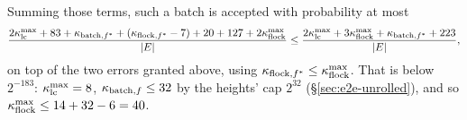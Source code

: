 Summing those terms, such a batch is accepted with probability at most
\[
\frac{2\kappa_{\mathrm{lc}}^{\max}+83+\kappa_{\mathrm{batch},f^\ast}+(\kappa_{\mathrm{flock},f^\ast}-7)+20+127+2\kappa_{\mathrm{flock}}^{\max}}{|E|}\le\frac{2\kappa_{\mathrm{lc}}^{\max}+3\kappa_{\mathrm{flock}}^{\max}+\kappa_{\mathrm{batch},f^\ast}+223}{|E|},
\]
on top of the two errors granted above, using $\kappa_{\mathrm{flock},f^\ast}\le\kappa_{\mathrm{flock}}^{\max}$. That is below $2^{-183}$: $\kappa_{\mathrm{lc}}^{\max}=8$, $\kappa_{\mathrm{batch},f}\le32$ by the heights' cap $2^{32}$ (\S\ref{sec:e2e-unrolled}), and so $\kappa_{\mathrm{flock}}^{\max}\le14+32-6=40$.
